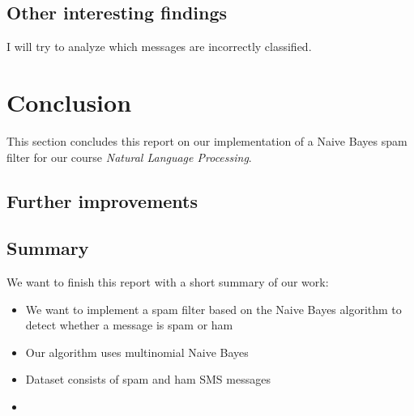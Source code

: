 \subsection{Other interesting findings}
I will try to analyze which messages are incorrectly classified.

\section{Conclusion}
This section concludes this report on our implementation of a Naive Bayes spam filter for our course \textit{Natural Language Processing}.

\subsection{Further improvements}

\subsection{Summary}
We want to finish this report with a short summary of our work:

\begin{itemize}
	\item We want to implement a spam filter based on the Naive Bayes algorithm to detect whether a message is spam or ham
	\item Our algorithm uses multinomial Naive Bayes
	\item Dataset consists of spam and ham SMS messages
	\item 
\end{itemize}

